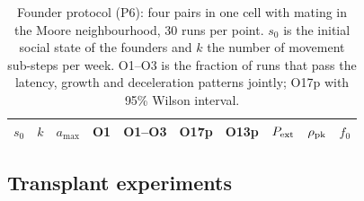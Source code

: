 \begin{table}[ht]
  \centering
  \caption{Founder protocol (P6): four pairs in one cell with mating in the Moore neighbourhood, 30 runs per point.
  $s_0$ is the initial social state of the founders and $k$ the number of movement sub-steps per week. O1--O3 is
  the fraction of runs that pass the latency, growth and deceleration patterns jointly; O17p with 95\% Wilson
  interval.}
  \label{tab:res-p6}
  \small
  \begin{tabular}{@{}cccccccccc@{}}
    \toprule
    $s_0$ & $k$ & $a_{\max}$ & O1 & O1--O3 & O17p & O13p & $P_{\rm ext}$ & $\rho_{\rm pk}$ & $f_0$ \\
    \midrule
    
  \end{tabular}
\end{table}

\subsection{Transplant experiments}
\label{sec:res-transplant}

